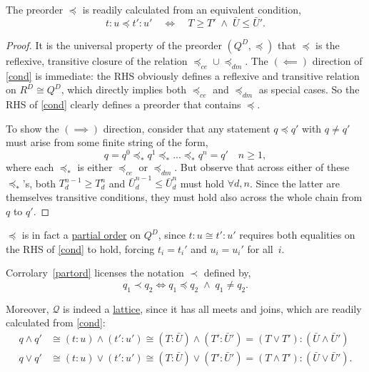 \documentclass{article}
\newcommand{\Q}{\ensuremath{\mathcal{Q}}}
\begin{document}
\begin{fact}
  The preorder $\preceq$ is readily calculated from an equivalent condition,
  \begin{equation}
  t\!:\!u \preceq t'\!:\!u' \quad\iff\quad T \ge T' \;\wedge\; \bar{U} \le \bar{U}'.\label{cond}
  \end{equation}
\end{fact}
\begin{proof}
  It is the universal property of the preorder $(Q^D, \preceq)$ that $\preceq$ is the reflexive, transitive closure of the relation $\preceq_{ce} \cup \preceq_{dm}$.  The $(\!\impliedby\!)$ direction of \eqref{cond} is immediate: the RHS obviously defines a reflexive and transitive relation on $R^D \cong Q^D$, which directly implies both $\preceq_{ce}$ and $\preceq_{dm}$ as special cases.  So the RHS of \eqref{cond} clearly defines a preorder that contains $\preceq$.

  To show the $(\!\implies\!)$ direction, consider that any statement $q \preceq q'$ with $q \neq q'$ must arise from some finite string of the form,
  \begin{equation}
  q = q^0 \preceq_* q^1 \preceq_* ... \preceq_* q^n = q' \quad n \ge 1, \label{string}
  \end{equation}
  where each $\preceq_*$ is either $\preceq_{ce}$ or $\preceq_{dm}$.  But observe that across either of these $\preceq_*$'s, both $T_d^{n-1} \ge T_d^n$ and $\bar{U}_d^{n-1} \le \bar{U}_d^n$ must hold $\forall d, n$.  Since the latter are themselves transitive conditions, they must hold also across the whole chain from $q$ to $q'$.  
\end{proof}

\begin{corr}\label{partord}
  $\preceq$ is in fact a \underline{partial order} on $Q^D$, since $t\!:\!u \cong t'\!:\!u'$ requires both equalities on the RHS of \eqref{cond} to hold, forcing $t_i = t_i'$ and $u_i = u_i'$ for all $\,i$.
\end{corr}

\begin{nota}
  Corrolary~\ref{partord} licenses the notation $\prec$ defined by,
  $$
  q_1 \prec q_2 \iff q_1 \preceq q_2 \;\wedge\; q_1 \neq q_2.
  $$
\end{nota}

\begin{corr}\label{lattice}
  Moreover, $\Q$ is indeed a \underline{lattice}, since it has all meets and joins, which are readily calculated from \eqref{cond}:
  \begin{equation}\label{meetjoin}
    \begin{aligned}
    q \wedge q' & \cong (t\!:\!u) \wedge (t'\!:\!u') \cong
    (T\!:\!\bar{U}) \wedge (T'\!:\!\bar{U}') = (T\!\vee\!T'):(\bar{U}\!\wedge\!\bar{U}')
    \\
    q \vee q' & \cong (t\!:\!u) \vee (t'\!:\!u') \cong
    (T\!:\!\bar{U}) \vee (T'\!:\!\bar{U}') = (T\!\wedge\!T'):(\bar{U}\!\vee\!\bar{U}').
    \end{aligned}
  \end{equation}
\end{corr}
\end{document}
